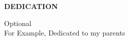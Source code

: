 




\begin{center}
	{\Large{\bf{DEDICATION}}}
\end{center}
Optional\\
For Example, Dedicated to my parents